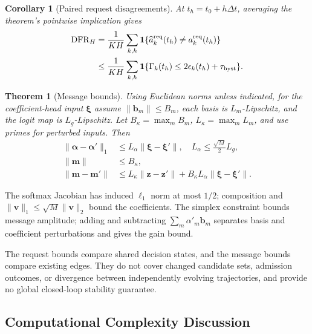 \documentclass[10pt,letterpaper,journal]{IEEEtran}
\newtheorem{theorem}{Theorem}
\newtheorem{corollary}{Corollary}[theorem]
\begin{document}
\begin{corollary}[Paired request disagreements]
\label{cor:finite_horizon_flip}
At $t_h=t_0+h\Delta t$, averaging the theorem's pointwise implication gives
\begin{equation}
\begin{aligned}
{\rm DFR}_H&=\frac1{KH}\sum_{k,h}\mathbf1\{\widehat a_k^{\rm req}(t_h)\ne a_k^{\rm req}(t_h)\}\\
&\le\frac1{KH}\sum_{k,h}\mathbf1\{\Gamma_k(t_h)\le2\epsilon_k(t_h)+\tau_{\rm hyst}\}.
\end{aligned}
\label{eq:dfr_bound}
\end{equation}
\end{corollary}

\begin{theorem}[Message bounds]
\label{thm:msg_lipschitz}
Using Euclidean norms unless indicated, for the coefficient-head input $\boldsymbol\xi$ assume $\|\mathbf b_m\|\le B_m$, each basis is $L_m$-Lipschitz, and the logit map is $L_g$-Lipschitz. Let $B_\kappa=\max_mB_m$, $L_\kappa=\max_mL_m$, and use primes for perturbed inputs. Then
\begin{align}
\|\boldsymbol\alpha-\boldsymbol\alpha'\|_1
&\le L_\alpha\|\boldsymbol\xi-\boldsymbol\xi'\|,
\quad L_\alpha\le\tfrac{\sqrt M}{2}L_g,
\label{eq:alpha_lip}\\
\|\mathbf m\|&\le B_\kappa,
\label{eq:proof_msg_bound}\\
\|\mathbf m-\mathbf m'\|
&\le L_\kappa\|\mathbf z-\mathbf z'\|
+B_\kappa L_\alpha\|\boldsymbol\xi-\boldsymbol\xi'\|.
\label{eq:proof_msg_lip}
\end{align}
\end{theorem}
\begin{IEEEproof}
The softmax Jacobian has induced $\ell_1$ norm at most $1/2$; composition and $\|\mathbf v\|_1\le\sqrt M\|\mathbf v\|_2$ bound the coefficients. The simplex constraint bounds message amplitude; adding and subtracting $\sum_m\alpha'_m\mathbf b_m$ separates basis and coefficient perturbations and gives the gain bound.
\end{IEEEproof}
The request bounds compare shared decision states, and the message bounds compare existing edges. They do not cover changed candidate sets, admission outcomes, or divergence between independently evolving trajectories, and provide no global closed-loop stability guarantee.
\endgroup

\subsection{Computational Complexity Discussion}
\label{subsec:complexity}
\end{document}
